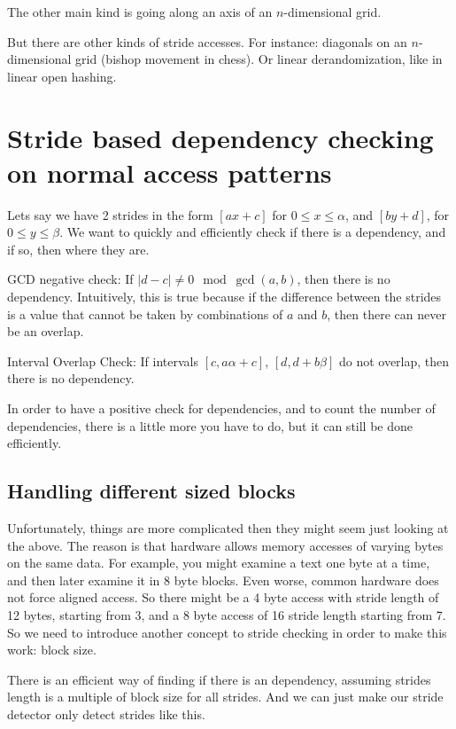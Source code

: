 \documentclass[12pt,twoside]{reedthesis}
\begin{document}
		The other main kind is going along an axis of an $n$-dimensional grid. 
		
		But there are other kinds of stride accesses. For instance: diagonals on an $n$-dimensional grid (bishop movement in chess). Or linear derandomization, like in linear open hashing. 
		
	\section{Stride based dependency checking on normal access patterns}
		
		Lets say we have 2 strides in the form $[ax+c]$ for $0\le x \le \alpha$, and $[by+d]$, for $0 \le y \le \beta$. We want to quickly and efficiently check if there is a dependency, and if so, then where they are. 
		
		GCD negative check: If $|d-c| \ne 0 \mod \gcd(a,b)$, then there is no dependency. Intuitively, this is true because if the difference between the strides is a value that cannot be taken by combinations of $a$ and $b$, then there can never be an overlap. 
		
		Interval Overlap Check: If intervals $[c,a\alpha+c]$, $[d,d+b\beta]$ do not overlap, then there is no dependency. 
		
		In order to have a positive check for dependencies, and to count the number of dependencies, there is a little more you have to do, but it can still be done efficiently. 
		
		\subsection{Handling different sized blocks}
		
		Unfortunately, things are more complicated then they might seem just looking at the above. 
		The reason is that hardware allows memory accesses of varying bytes on the same data. For example, you might examine a text one byte at a time, and then later examine it in 8 byte blocks. Even worse, common hardware does not force aligned access. So there might be a 4 byte access with stride length of 12 bytes, starting from 3, and a 8 byte access of 16 stride length starting from 7. So we need to introduce another concept to stride checking in order to make this work: block size. 
		
		There is an efficient way of finding if there is an dependency, assuming strides length is a multiple of block size for all strides. And we can just make our stride detector only detect strides like this.
		
\end{document}
